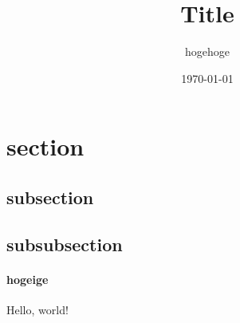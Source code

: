 \documentclass{article}
\title{Title}
\author{hogehoge}
\date{\today}
\begin{document}
\maketitle
\tableofcontents


\newpage
\section{section}
\subsection{subsection}
\subsection{subsubsection}
\paragraph{hogeige}

\textbf{}

Hello, world!
\end{document}
